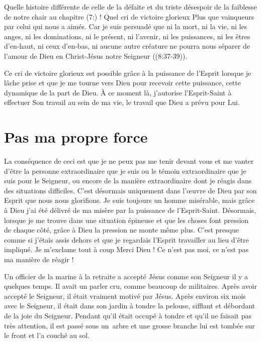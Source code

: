 Quelle histoire différente de celle de la défaite et du triste désespoir
 de la faiblesse de notre chair au chapitre (7:) !
 Quel cri de victoire glorieux\frcolon{}
 \Og Plus que vainqueurs par celui qui nous a aimés.
 Car je suis persuadé que ni la mort, ni la vie, ni les anges,
 ni les dominations, ni le présent, ni l'avenir, ni les puissances,
 ni les êtres d'en-haut, ni ceux d'en-bas, ni aucune autre créature
 ne pourra nous séparer de l'amour de Dieu en Christ-Jésus
 notre Seigneur \Fg{} ((8:37-39)).

Ce cri de victoire glorieux est possible grâce à la puissance de l'Es\-prit
 lorsque je lâche prise et que je me tourne vers Dieu pour recevoir
 cette puissance, cette dynamique de la part de Dieu. À ce moment là,
 j'autorise l'Esprit-Saint à effectuer Son travail au sein de ma vie,
 le travail que Dieu a prévu pour Lui.


\section{Pas ma propre force}

La conséquence de ceci est que je ne peux pas me tenir devant vous
 et me vanter d'être la personne extraordinaire que je suis
 ou le témoin extraordinaire que je suis pour le Seigneur,
 ou encore de la manière extraordinaire dont je réagis dans des
 situations difficiles.
 C'est désormais uniquement dans l'\oe{}uvre de Dieu par son Esprit
 que nous nous glorifions.
 Je suis toujours un homme misérable, mais grâce à Dieu
 j'ai été délivré de ma misère par la puissance de l'Esprit-Saint.
 Désormais, lorsque je me trouve dans une situation épineuse
 et que les choses font pression de chaque côté, grâce à Dieu la pression
 ne monte même plus.
 C'est presque comme si j'étais assis dehors et que je regardais l'Esprit travailler
 au lieu d'être impliqué.
 Je m'exclame tout à coup\frcolon{}
 \Og Merci Dieu ! Ce n'est pas moi,
 ce n'est pas ma manière de réagir ! \Fg{}

Un officier de la marine à la retraite a accepté Jésus comme son Seigneur
 il y a quelques temps.
 Il avait un parler cru, comme beaucoup de militaires.
 Après avoir accepté le Seigneur, il était vraiment motivé par Jésus.
 Après environ six mois avec le Seigneur, il était dans son jardin
 à tondre la pelouse, sifflant et débordant
 de la joie du Seigneur.
 Pendant qu'il était occupé à tondre et qu'il ne faisait pas très attention,
 il est passé sous un~arbre et une grosse branche lui est tombée sur le front
 et l'a couché au sol.

